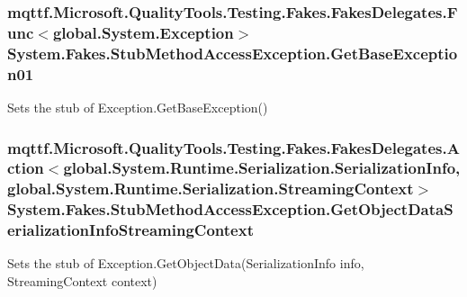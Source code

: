 \hypertarget{class_system_1_1_fakes_1_1_stub_method_access_exception_a29a5e961c14e2e70772ef38647b44660}{
\subsubsection[{Get\-Base\-Exception01}]{\setlength{\rightskip}{0pt plus 5cm}mqttf.\-Microsoft.\-Quality\-Tools.\-Testing.\-Fakes.\-Fakes\-Delegates.\-Func$<$global.\-System.\-Exception$>$ System.\-Fakes.\-Stub\-Method\-Access\-Exception.\-Get\-Base\-Exception01}}\label{class_system_1_1_fakes_1_1_stub_method_access_exception_a29a5e961c14e2e70772ef38647b44660}


Sets the stub of Exception.\-Get\-Base\-Exception()

\hypertarget{class_system_1_1_fakes_1_1_stub_method_access_exception_a5dd7f4570d93f6d457b506e80d64748a}{
\subsubsection[{Get\-Object\-Data\-Serialization\-Info\-Streaming\-Context}]{\setlength{\rightskip}{0pt plus 5cm}mqttf.\-Microsoft.\-Quality\-Tools.\-Testing.\-Fakes.\-Fakes\-Delegates.\-Action$<$global.\-System.\-Runtime.\-Serialization.\-Serialization\-Info, global.\-System.\-Runtime.\-Serialization.\-Streaming\-Context$>$ System.\-Fakes.\-Stub\-Method\-Access\-Exception.\-Get\-Object\-Data\-Serialization\-Info\-Streaming\-Context}}\label{class_system_1_1_fakes_1_1_stub_method_access_exception_a5dd7f4570d93f6d457b506e80d64748a}


Sets the stub of Exception.\-Get\-Object\-Data(\-Serialization\-Info info, Streaming\-Context context)

